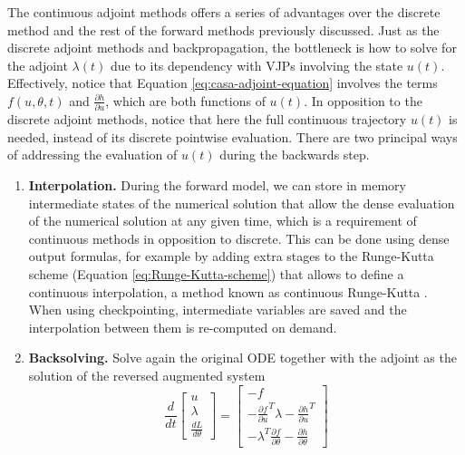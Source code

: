 The continuous adjoint methods offers a series of advantages over the discrete method and the rest of the forward methods previously discussed. 
Just as the discrete adjoint methods and backpropagation, the bottleneck is how to solve for the adjoint $\lambda(t)$ due to its dependency with VJPs involving the state $u(t)$.
Effectively, notice that Equation \eqref{eq:casa-adjoint-equation} involves the terms $f(u, \theta, t)$ and $\frac{\partial h}{\partial u}$, which are both functions of $u(t)$. 
In opposition to the discrete adjoint methods, notice that here the full continuous trajectory $u(t)$ is needed, instead of its discrete pointwise evaluation. 
There are two principal ways of addressing the evaluation of $u(t)$ during the backwards step.
\begin{enumerate}[label=(\roman*)]
    \item \textbf{Interpolation.} During the forward model, we can store in memory intermediate states of the numerical solution that allow the dense evaluation of the numerical solution at any given time, which is a requirement of continuous methods in opposition to discrete. 
    This can be done using dense output formulas, for example by adding extra stages to the Runge-Kutta scheme (Equation \eqref{eq:Runge-Kutta-scheme}) that allows to define a continuous interpolation, a method known as continuous Runge-Kutta \cite{hairer-solving-2, Alexe_Sandu_2009}. 
    When using checkpointing, intermediate variables are saved and the interpolation between them is re-computed on demand. 
    \item \textbf{Backsolving.} Solve again the original ODE together with the adjoint as the solution of the reversed augmented system \cite{chen_neural_2019}
    \begin{equation}
    \frac{d}{dt}
    \begin{bmatrix}
       u \\
       \lambda \\
       \frac{dL}{d\theta}
    \end{bmatrix}
    = 
    \begin{bmatrix}
       -f \\
       - \frac{\partial f}{\partial u}^T \lambda - \frac{\partial h}{\partial u}^T \\
       - \lambda^T \frac{\partial f}{\partial \theta} - \frac{\partial h}{\partial \theta}

\end{bmatrix}
\end{equation}
\end{enumerate}
